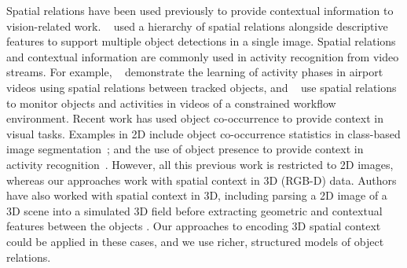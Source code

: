 \documentclass[letterpaper]{article}
\begin{document}
Spatial relations have been used previously to provide contextual information to vision-related work. \citeauthor{MyungJin:CVPR2010}~ used a hierarchy of spatial relations alongside descriptive features to support multiple object detections in a single image. Spatial relations and contextual information are commonly used in activity recognition from video streams. For example, \citeauthor{Krishna:ECAI2010}~ demonstrate the learning of activity phases in airport videos using spatial relations between tracked objects, and \citeauthor{Behera2012}~ use spatial relations to monitor objects and activities in videos of a constrained workflow environment. Recent work has used object co-occurrence to provide context in visual  tasks. Examples in 2D include object co-occurrence statistics in class-based image segmentation~\cite{Ladicky:IJCV2013}; and the use of object presence to provide context in activity recognition~\cite{Li:2012}. However, all this previous work is restricted to 2D images, whereas our approaches work with spatial context in 3D (RGB-D) data. Authors have also worked with spatial context in 3D, including parsing a 2D image of a 3D scene into a simulated 3D field before extracting geometric and contextual features between the objects \cite{Xiao:SIGGRAPH2012}. Our approaches to encoding 3D spatial context could be applied in these cases, and we use richer, structured models of object relations.
\end{document}
